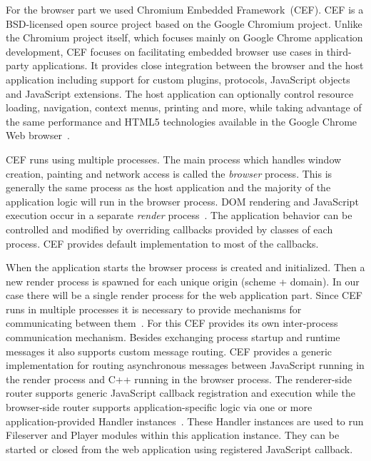 For the browser part we used Chromium Embedded Framework~(CEF). CEF is a BSD-licensed open source project based on the Google Chromium project. Unlike the Chromium project itself, which focuses mainly on Google Chrome application development, CEF focuses on facilitating embedded browser use cases in third-party applications. It provides close integration between the browser and the host application including support for custom plugins, protocols, JavaScript objects and JavaScript extensions. The host application can optionally control resource loading, navigation, context menus, printing and more, while taking advantage of the same performance and HTML5 technologies available in the Google Chrome Web browser~\citep{cefGithub}.
\par
CEF runs using multiple processes. The main process which handles window creation, painting and network access is called the \textit{browser} process. This is generally the same process as the host application and the majority of the application logic will run in the browser process. DOM rendering and JavaScript execution occur in a separate \textit{render} process~\citep{cefTutorial}. The application behavior can be controlled and modified by overriding callbacks provided by classes of each process. CEF provides default implementation to most of the callbacks.
\par
When the application starts the browser process is created and initialized. Then a new render process is spawned for each unique origin (scheme + domain). In our case there will be a single render process for the web application part. Since CEF runs in multiple processes it is necessary to provide mechanisms for communicating between them~\citep{cefTutorial}. For this CEF provides its own inter-process communication mechanism. Besides exchanging process startup and runtime messages it also supports custom message routing. CEF provides a generic implementation for routing asynchronous messages between JavaScript running in the render process and C++ running in the browser process. The renderer-side router supports generic JavaScript callback registration and execution while the browser-side router supports application-specific logic via one or more application-provided Handler instances~\citep{cefTutorial}. These Handler instances are used to run Fileserver and Player modules within this application instance. They can be started or closed from the web application using registered JavaScript callback.

